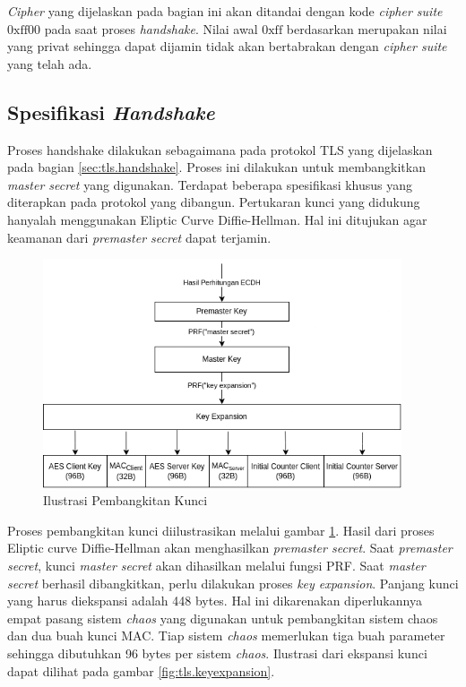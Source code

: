 \emph{Cipher} yang dijelaskan pada bagian ini akan ditandai dengan kode \emph{cipher suite} $\text{0xff00}$ pada saat proses \emph{handshake}. Nilai awal $\text{0xff}$ berdasarkan \textcite{rfc5246} merupakan nilai yang privat sehingga dapat dijamin tidak akan bertabrakan dengan \emph{cipher suite} yang telah ada.

\subsection{Spesifikasi \emph{Handshake}}
Proses handshake dilakukan sebagaimana pada protokol TLS yang dijelaskan pada bagian \ref{sec:tls.handshake}. Proses ini dilakukan untuk membangkitkan \emph{master secret} yang digunakan. Terdapat beberapa spesifikasi khusus yang diterapkan pada protokol yang dibangun. Pertukaran kunci yang didukung hanyalah menggunakan Eliptic Curve Diffie-Hellman. Hal ini ditujukan agar keamanan dari \emph{premaster secret} dapat terjamin.

\begin{figure}[!h]
  \centering
  \includegraphics[width=400px]{chapters/res/chapter-3/img/keygen.png}
  \caption{Ilustrasi Pembangkitan Kunci} \label{fig:tls.keygen}
\end{figure}


Proses pembangkitan kunci diilustrasikan melalui gambar \ref{fig:tls.keygen}. Hasil dari proses Eliptic curve Diffie-Hellman akan menghasilkan \emph{premaster secret}. Saat \emph{premaster secret}, kunci \emph{master secret} akan dihasilkan melalui fungsi PRF. Saat \emph{master secret} berhasil dibangkitkan, perlu dilakukan proses \emph{key expansion}. Panjang kunci yang harus diekspansi adalah 448 bytes. Hal ini dikarenakan diperlukannya empat pasang sistem \emph{chaos} yang digunakan untuk pembangkitan sistem chaos dan dua buah kunci MAC. Tiap sistem \emph{chaos} memerlukan tiga buah parameter sehingga dibutuhkan 96 bytes per sistem \emph{chaos}. Ilustrasi dari ekspansi kunci dapat dilihat pada gambar \ref{fig:tls.keyexpansion}.

